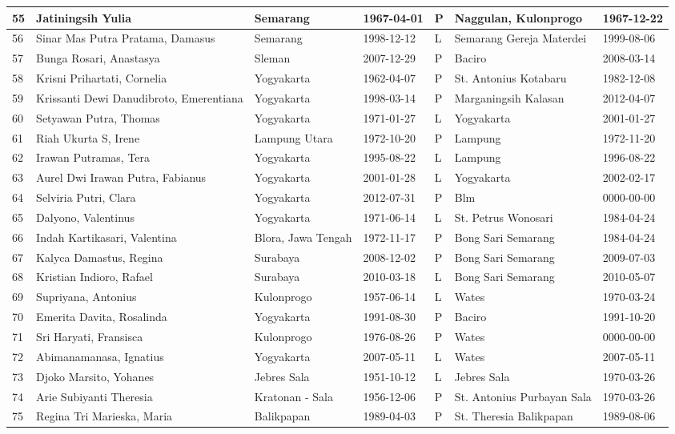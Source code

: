 \begin{longtable}{|m{5mm}|m{45mm}|m{20mm}|m{20mm}|m{5mm}|m{25mm}|m{20mm}|}
	55&Jatiningsih Yulia&Semarang&1967-04-01&P&Naggulan, Kulonprogo&1967-12-22\\ \hline 
	56&Sinar Mas Putra Pratama, Damasus&Semarang&1998-12-12&L&Semarang Gereja Materdei&1999-08-06\\ \hline 
	57&Bunga Rosari, Anastasya&Sleman&2007-12-29&P&Baciro&2008-03-14\\ \hline 
	58&Krisni Prihartati, Cornelia&Yogyakarta&1962-04-07&P&St. Antonius Kotabaru&1982-12-08\\ \hline 
	59&Krissanti Dewi Danudibroto, Emerentiana&Yogyakarta&1998-03-14&P&Marganingsih Kalasan&2012-04-07\\ \hline 
	60&Setyawan Putra, Thomas&Yogyakarta&1971-01-27&L&Yogyakarta&2001-01-27\\ \hline 
	61&Riah Ukurta S, Irene&Lampung Utara&1972-10-20&P&Lampung&1972-11-20\\ \hline 
	62&Irawan Putramas, Tera&Yogyakarta&1995-08-22&L&Lampung&1996-08-22\\ \hline 
	63&Aurel Dwi Irawan Putra, Fabianus&Yogyakarta&2001-01-28&L&Yogyakarta&2002-02-17\\ \hline 
	64&Selviria Putri, Clara&Yogyakarta&2012-07-31&P&Blm&0000-00-00\\ \hline 
	65&Dalyono, Valentinus&Yogyakarta&1971-06-14&L&St. Petrus Wonosari&1984-04-24\\ \hline 
	66&Indah Kartikasari, Valentina&Blora, Jawa Tengah&1972-11-17&P&Bong Sari Semarang&1984-04-24\\ \hline 
	67&Kalyca Damastus, Regina&Surabaya&2008-12-02&P&Bong Sari Semarang&2009-07-03\\ \hline 
	68&Kristian Indioro, Rafael&Surabaya&2010-03-18&L&Bong Sari Semarang&2010-05-07\\ \hline 
	69&Supriyana, Antonius&Kulonprogo&1957-06-14&L&Wates&1970-03-24\\ \hline 
	70&Emerita Davita, Rosalinda&Yogyakarta&1991-08-30&P&Baciro&1991-10-20\\ \hline 
	71&Sri Haryati, Fransisca&Kulonprogo&1976-08-26&P&Wates&0000-00-00\\ \hline 
	72&Abimanamanasa, Ignatius&Yogyakarta&2007-05-11&L&Wates&2007-05-11\\ \hline 
	73&Djoko Marsito, Yohanes&Jebres Sala&1951-10-12&L&Jebres Sala&1970-03-26\\ \hline 
	74&Arie Subiyanti Theresia&Kratonan - Sala&1956-12-06&P&St. Antonius Purbayan Sala&1970-03-26\\ \hline 
	75&Regina Tri Marieska, Maria&Balikpapan&1989-04-03&P&St. Theresia Balikpapan&1989-08-06\\ \hline 

\end{longtable}
